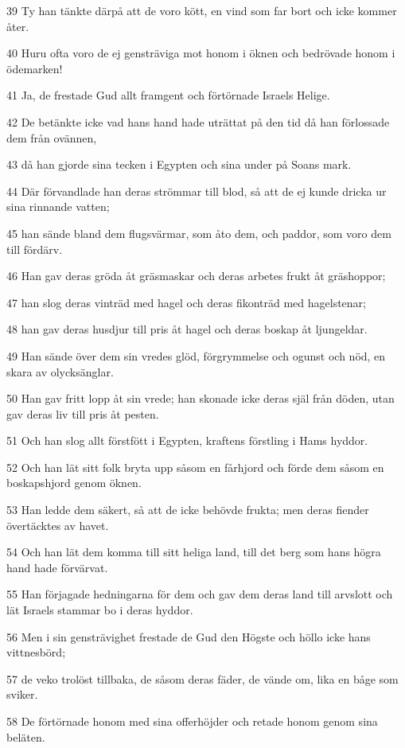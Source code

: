 \par 39 Ty han tänkte därpå att de voro kött, en vind som far bort och icke kommer åter.
\par 40 Huru ofta voro de ej gensträviga mot honom i öknen och bedrövade honom i ödemarken!
\par 41 Ja, de frestade Gud allt framgent och förtörnade Israels Helige.
\par 42 De betänkte icke vad hans hand hade uträttat på den tid då han förlossade dem från ovännen,
\par 43 då han gjorde sina tecken i Egypten och sina under på Soans mark.
\par 44 Där förvandlade han deras strömmar till blod, så att de ej kunde dricka ur sina rinnande vatten;
\par 45 han sände bland dem flugsvärmar, som åto dem, och paddor, som voro dem till fördärv.
\par 46 Han gav deras gröda åt gräsmaskar och deras arbetes frukt åt gräshoppor;
\par 47 han slog deras vinträd med hagel och deras fikonträd med hagelstenar;
\par 48 han gav deras husdjur till pris åt hagel och deras boskap åt ljungeldar.
\par 49 Han sände över dem sin vredes glöd, förgrymmelse och ogunst och nöd, en skara av olycksänglar.
\par 50 Han gav fritt lopp åt sin vrede; han skonade icke deras själ från döden, utan gav deras liv till pris åt pesten.
\par 51 Och han slog allt förstfött i Egypten, kraftens förstling i Hams hyddor.
\par 52 Och han lät sitt folk bryta upp såsom en fårhjord och förde dem såsom en boskapshjord genom öknen.
\par 53 Han ledde dem säkert, så att de icke behövde frukta; men deras fiender övertäcktes av havet.
\par 54 Och han lät dem komma till sitt heliga land, till det berg som hans högra hand hade förvärvat.
\par 55 Han förjagade hedningarna för dem och gav dem deras land till arvslott och lät Israels stammar bo i deras hyddor.
\par 56 Men i sin gensträvighet frestade de Gud den Högste och höllo icke hans vittnesbörd;
\par 57 de veko trolöst tillbaka, de såsom deras fäder, de vände om, lika en båge som sviker.
\par 58 De förtörnade honom med sina offerhöjder och retade honom genom sina beläten.
